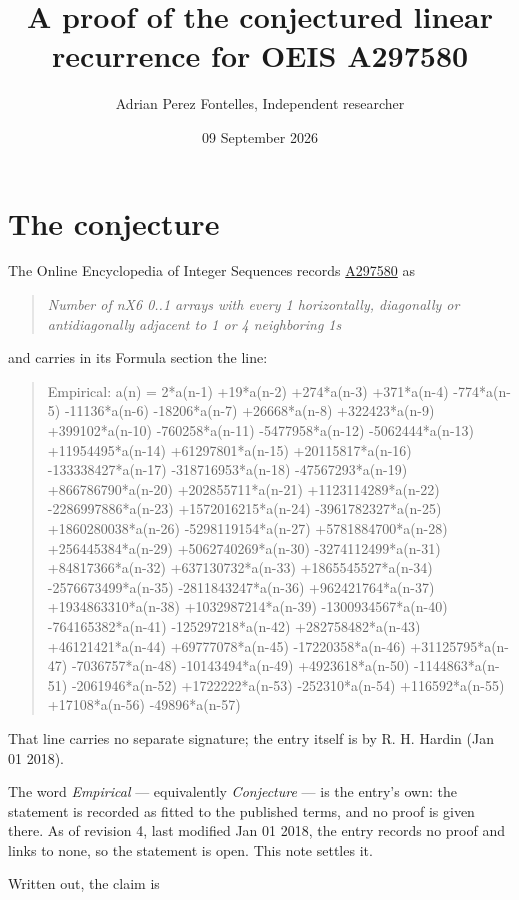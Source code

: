 \documentclass[11pt]{article}
\title{A proof of the conjectured linear recurrence for OEIS A297580}
\author{Adrian Perez Fontelles, Independent researcher}
\date{09 September 2026}
\theoremstyle{definition}
\begin{document}
\maketitle
\section{The conjecture}

The Online Encyclopedia of Integer Sequences records \href{https://oeis.org/A297580}{A297580} as

\begin{quote}\itshape Number of nX6 0..1 arrays with every 1 horizontally, diagonally or antidiagonally adjacent to 1 or 4 neighboring 1s\end{quote}

and carries in its Formula section the line:

\begin{quote}\ttfamily Empirical: a(n) = 2*a(n-1) +19*a(n-2) +274*a(n-3) +371*a(n-4) -774*a(n-5) -11136*a(n-6) -18206*a(n-7) +26668*a(n-8) +322423*a(n-9) +399102*a(n-10) -760258*a(n-11) -5477958*a(n-12) -5062444*a(n-13) +11954495*a(n-14) +61297801*a(n-15) +20115817*a(n-16) -133338427*a(n-17) -318716953*a(n-18) -47567293*a(n-19) +866786790*a(n-20) +202855711*a(n-21) +1123114289*a(n-22) -2286997886*a(n-23) +1572016215*a(n-24) -3961782327*a(n-25) +1860280038*a(n-26) -5298119154*a(n-27) +5781884700*a(n-28) +256445384*a(n-29) +5062740269*a(n-30) -3274112499*a(n-31) +84817366*a(n-32) +637130732*a(n-33) +1865545527*a(n-34) -2576673499*a(n-35) -2811843247*a(n-36) +962421764*a(n-37) +1934863310*a(n-38) +1032987214*a(n-39) -1300934567*a(n-40) -764165382*a(n-41) -125297218*a(n-42) +282758482*a(n-43) +46121421*a(n-44) +69777078*a(n-45) -17220358*a(n-46) +31125795*a(n-47) -7036757*a(n-48) -10143494*a(n-49) +4923618*a(n-50) -1144863*a(n-51) -2061946*a(n-52) +1722222*a(n-53) -252310*a(n-54) +116592*a(n-55) +17108*a(n-56) -49896*a(n-57)\end{quote}

That line carries no separate signature; the entry itself is by R. H. Hardin (Jan 01 2018).

The word {\itshape Empirical} --- equivalently {\itshape Conjecture} --- is the entry's own: the statement is recorded as fitted to the published terms, and no proof is given there. As of revision 4, last modified Jan 01 2018, the entry records no proof and links to none, so the statement is open. This note settles it.

Written out, the claim is
\end{document}

